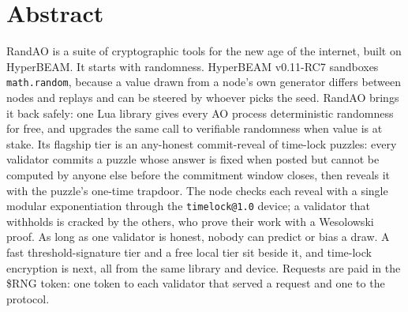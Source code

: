 \section*{Abstract}
RandAO is a suite of cryptographic tools for the new age of the internet, built on HyperBEAM. It starts with randomness. HyperBEAM v0.11-RC7 sandboxes \texttt{math.random}, because a value drawn from a node's own generator differs between nodes and replays and can be steered by whoever picks the seed. RandAO brings it back safely: one Lua library gives every AO process deterministic randomness for free, and upgrades the same call to verifiable randomness when value is at stake. Its flagship tier is an any-honest commit-reveal of time-lock puzzles: every validator commits a puzzle whose answer is fixed when posted but cannot be computed by anyone else before the commitment window closes, then reveals it with the puzzle's one-time trapdoor. The node checks each reveal with a single modular exponentiation through the \texttt{timelock@1.0} device; a validator that withholds is cracked by the others, who prove their work with a Wesolowski proof. As long as one validator is honest, nobody can predict or bias a draw. A fast threshold-signature tier and a free local tier sit beside it, and time-lock encryption is next, all from the same library and device. Requests are paid in the \$RNG token: one token to each validator that served a request and one to the protocol.
